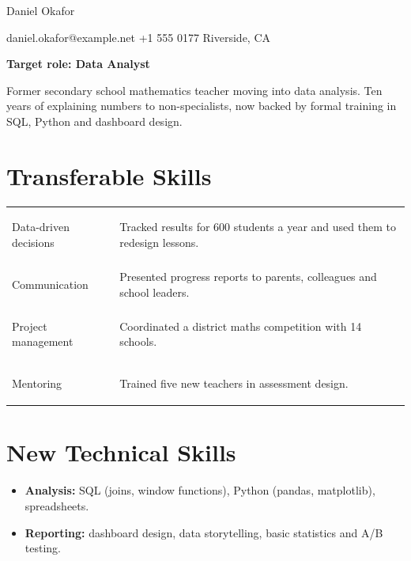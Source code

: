 \documentclass[11pt]{article}
\begin{document}
\begin{center}
  {\fontsize{26}{30}\selectfont Daniel Okafor}\par\vspace{0.6ex}
  daniel.okafor@example.net \quad \textbar \quad +1 555 0177 \quad \textbar \quad Riverside, CA
\end{center}

\begin{tcolorbox}[enhanced,colback=soft,colframe=deepteal,boxrule=0pt,leftrule=4pt,arc=0pt,left=10pt]
  \textbf{\color{deepteal}Target role: Data Analyst}\par\smallskip
  Former secondary school mathematics teacher moving into data analysis. Ten years of explaining numbers to non-specialists, now backed by formal training in SQL, Python and dashboard design.
\end{tcolorbox}

\section{Transferable Skills}
\renewcommand{\arraystretch}{1.3}
\begin{tabularx}{\textwidth}{@{}>{\bfseries\raggedright}p{4.2cm} X@{}}
  Data-driven decisions & Tracked results for 600 students a year and used them to redesign lessons. \\
  Communication & Presented progress reports to parents, colleagues and school leaders. \\
  Project management & Coordinated a district maths competition with 14 schools. \\
  Mentoring & Trained five new teachers in assessment design. \\
\end{tabularx}

\section{New Technical Skills}
\begin{itemize}
  \item \textbf{Analysis:} SQL (joins, window functions), Python (pandas, matplotlib), spreadsheets.
  \item \textbf{Reporting:} dashboard design, data storytelling, basic statistics and A/B testing.
\end{itemize}
\end{document}
